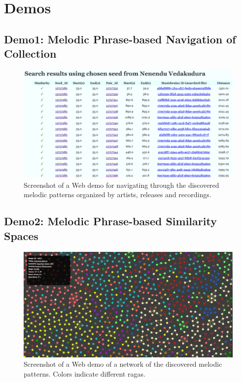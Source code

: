\section{Demos}
\subsection*{Demo1: Melodic Phrase-based Navigation of Collection}

\begin{figure}
	\begin{center}
		\includegraphics[width=\figSizeHundred]{ch08_applications/figures/patternBrowsing1.png}
	\end{center}
	\caption{Screenshot of a Web demo for navigating through the discovered melodic patterns organized by artists, releases and recordings.}
	\label{fig:browser_patterns}
\end{figure}

\subsection*{Demo2: Melodic Phrase-based Similarity Spaces}

\begin{figure}
	\begin{center}
		\includegraphics[width=\figSizeHundred]{ch08_applications/figures/patternNetwork1.png}
	\end{center}
	\caption{Screenshot of a Web demo of a network of the discovered melodic patterns. Colors indicate different \glspl{raga}.}
	\label{fig:network_patterns}
\end{figure}



